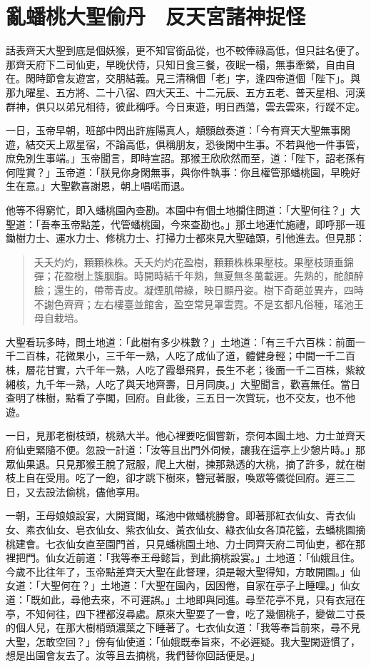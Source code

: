 
\chapter{亂蟠桃大聖偷丹　反天宮諸神捉怪}

話表齊天大聖到底是個妖猴，更不知官銜品從，也不較俸祿高低，但只註名便了。那齊天府下二司仙吏，早晚伏侍，只知日食三餐，夜眠一榻，無事牽縈，自由自在。閑時節會友遊宮，交朋結義。見三清稱個「老」字，逢四帝道個「陛下」。與那九曜星、五方將、二十八宿、四大天王、十二元辰、五方五老、普天星相、河漢群神，俱只以弟兄相待，彼此稱呼。今日東遊，明日西蕩，雲去雲來，行蹤不定。

一日，玉帝早朝，班部中閃出許旌陽真人，頫顖啟奏道：「今有齊天大聖無事閑遊，結交天上眾星宿，不論高低，俱稱朋友，恐後閑中生事。不若與他一件事管，庶免別生事端。」玉帝聞言，即時宣詔。那猴王欣欣然而至，道：「陛下，詔老孫有何陞賞？」玉帝道：「朕見你身閑無事，與你件執事：你且權管那蟠桃園，早晚好生在意。」大聖歡喜謝恩，朝上唱喏而退。

他等不得窮忙，即入蟠桃園內查勘。本園中有個土地攔住問道：「大聖何往？」大聖道：「吾奉玉帝點差，代管蟠桃園，今來查勘也。」那土地連忙施禮，即呼那一班鋤樹力士、運水力士、修桃力士、打掃力士都來見大聖磕頭，引他進去。但見那：
\begin{quote}
夭夭灼灼，顆顆株株。夭夭灼灼花盈樹，顆顆株株果壓枝。果壓枝頭垂錦彈；花盈樹上簇胭脂。時開時結千年熟，無夏無冬萬載遲。先熟的，酡顏醉臉；還生的，帶蒂青皮。凝煙肌帶綠，映日顯丹姿。樹下奇葩並異卉，四時不謝色齊齊；左右樓臺並館舍，盈空常見罩雲霓。不是玄都凡俗種，瑤池王母自栽培。
\end{quote}

大聖看玩多時，問土地道：「此樹有多少株數？」土地道：「有三千六百株：前面一千二百株，花微果小，三千年一熟，人吃了成仙了道，體健身輕；中間一千二百株，層花甘實，六千年一熟，人吃了霞舉飛昇，長生不老；後面一千二百株，紫紋緗核，九千年一熟，人吃了與天地齊壽，日月同庚。」大聖聞言，歡喜無任。當日查明了株樹，點看了亭閣，回府。自此後，三五日一次賞玩，也不交友，也不他遊。

一日，見那老樹枝頭，桃熟大半。他心裡要吃個嘗新，奈何本園土地、力士並齊天府仙吏緊隨不便。忽設一計道：「汝等且出門外伺候，讓我在這亭上少憩片時。」那眾仙果退。只見那猴王脫了冠服，爬上大樹，揀那熟透的大桃，摘了許多，就在樹枝上自在受用。吃了一飽，卻才跳下樹來，簪冠著服，喚眾等儀從回府。遲三二日，又去設法偷桃，儘他享用。

一朝，王母娘娘設宴，大開寶閣，瑤池中做蟠桃勝會。即著那紅衣仙女、青衣仙女、素衣仙女、皂衣仙女、紫衣仙女、黃衣仙女、綠衣仙女各頂花籃，去蟠桃園摘桃建會。七衣仙女直至園門首，只見蟠桃園土地、力士同齊天府二司仙吏，都在那裡把門。仙女近前道：「我等奉王母懿旨，到此摘桃設宴。」土地道：「仙娥且住。今歲不比往年了，玉帝點差齊天大聖在此督理，須是報大聖得知，方敢開園。」仙女道：「大聖何在？」土地道：「大聖在園內，因困倦，自家在亭子上睡哩。」仙女道：「既如此，尋他去來，不可遲誤。」土地即與同進。尋至花亭不見，只有衣冠在亭，不知何往，四下裡都沒尋處。原來大聖耍了一會，吃了幾個桃子，變做二寸長的個人兒，在那大樹梢頭濃葉之下睡著了。七衣仙女道：「我等奉旨前來，尋不見大聖，怎敢空回？」傍有仙使道：「仙娥既奉旨來，不必遲疑。我大聖閑遊慣了，想是出園會友去了。汝等且去摘桃，我們替你回話便是。」

